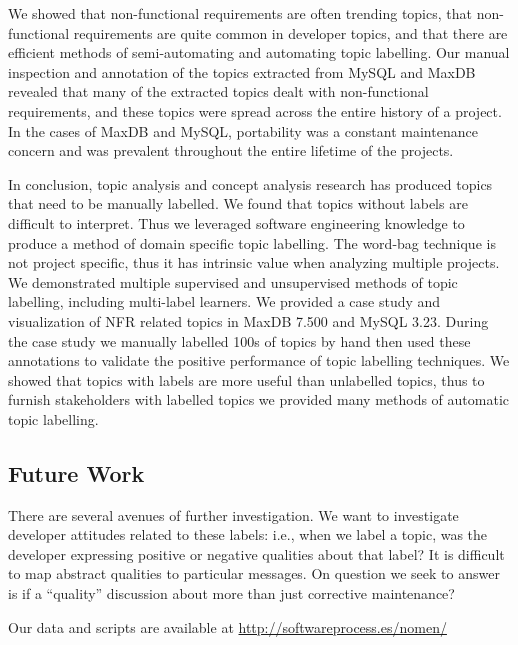 \documentclass[]{sig-alternate}
\begin{document}
We showed that non-functional requirements are often trending topics, that non-functional requirements are quite common in developer topics, and that there are efficient methods of semi-automating and automating topic labelling.
Our manual inspection and annotation of the topics extracted from MySQL and MaxDB revealed that many of the extracted topics dealt with non-functional requirements, and these topics were spread across the entire history of a project. 
In the cases of MaxDB and MySQL, portability was a constant maintenance concern and was prevalent throughout the entire lifetime of the projects.

In conclusion,
topic analysis and concept analysis research has produced topics that need to be manually labelled. 
We found that topics without labels are difficult to interpret.
Thus we leveraged software engineering knowledge to produce a method of domain specific topic labelling.
The word-bag technique is not project specific, thus it has intrinsic value when analyzing multiple projects.
We demonstrated multiple supervised and unsupervised methods of topic labelling, including multi-label learners.
We provided a case study and visualization of NFR related topics in MaxDB 7.500 and MySQL 3.23. 
During the case study we manually labelled 100s of topics by hand then used these annotations to validate the positive performance of topic labelling techniques.
We showed that topics with labels are more useful than unlabelled topics, thus to furnish stakeholders with labelled topics we provided many methods of automatic topic labelling.

  
\subsection{Future Work}
 
There are several avenues of further investigation.  
We want to investigate developer attitudes related to these labels: i.e., when we label a topic, was the developer expressing positive or negative qualities about that label?  
It is difficult to map abstract qualities to particular messages. %
On question we seek to answer is if a ``quality'' discussion about more than just corrective maintenance? %
 

\appendix

Our data and scripts are available at \url{http://softwareprocess.es/nomen/}


%

\end{document}
